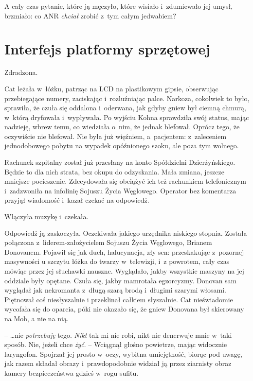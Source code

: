 \documentclass[oneside,polish,11pt,sfheadings]{mwbk}
\begin{document}
A cały czas pytanie, które ją męczyło, które wisiało i~zdumiewało jej
umysł, brzmiało: co ANR \emph{chciał} zrobić z~tym całym jedwabiem?

\chapter{Interfejs platformy sprzętowej}

Zdradzona.

Cat leżała w~łóżku, patrząc na LCD na plastikowym gipsie, obserwując
przebiegające numery, zaciskając i~rozluźniając palce. Narkoza,
cokolwiek to było, sprawiła, że czuła się oddalona i~oderwana, jak gdyby
gniew był ciemną chmurą, w~którą dryfowała i~wypływała. Po wyjściu Kohna
sprawdziła swój status, mając nadzieję, wbrew temu, co wiedziała o~nim,
że jednak blefował. Oprócz tego, że oczywiście nie blefował. Nie była
już więźniem, a~pacjentem: z~zaleceniem jednodobowego pobytu na wypadek
opóźnionego szoku, ale poza tym wolnego.

Rachunek szpitalny został już przesłany na konto Spółdzielni
Dzierżyńskiego. Będzie to dla nich strata, bez okupu do odzyskania. Mała
zmiana, jeszcze mniejsze pocieszenie. Zdecydowała się obciążyć ich też
rachunkiem telefonicznym i~zadzwoniła na infolinię Sojuszu Życia
Węglowego. Operator bez komentarza przyjął wiadomość i~kazał czekać na
odpowiedź.

Włączyła muzykę i~czekała.

Odpowiedź ją zaskoczyła. Oczekiwała jakiego urzędnika niskiego stopnia.
Została połączona z~liderem-założycielem Sojuszu Życia Węglowego,
Brianem Donovanem. Pojawił się jak duch, halucynacja, zły sen:
przeskakując z~pozornej masywności u szczytu łóżka do twarzy w~telewizji, i~z powrotem, cały czas mówiąc przez jej słuchawki nauszne.
Wyglądało, jakby wszystkie maszyny na jej oddziale były opętane. Czuła
się, jakby mamrotała egzorcyzmy. Donovan sam wyglądał jak nekromanta z~długą szarą brodą i~długimi szarymi włosami. Piętnował coś niesłyszalnie
i przeklinał całkiem słyszalnie. Cat nieświadomie wycofała się do
oparcia, póki nie okazało się, że gniew Donovana był skierowany na Moh,
a nie na nią.

-- \ldots nie \emph{potrzebuję} tego. \emph{Nikt} tak mi nie robi, nikt nie
denerwuje mnie w~taki sposób. Nie, jeżeli chce \emph{żyć}. -- Wciągnął
głośno powietrze, mając widocznie laryngofon. Spojrzał jej prosto w~oczy, wybitna umiejętność, biorąc pod uwagę, jak razem składał obrazy i~prawdopodobnie widział ją przez ziarnisty obraz kamery bezpieczeństwa
gdzieś w~rogu sufitu.
\end{document}
